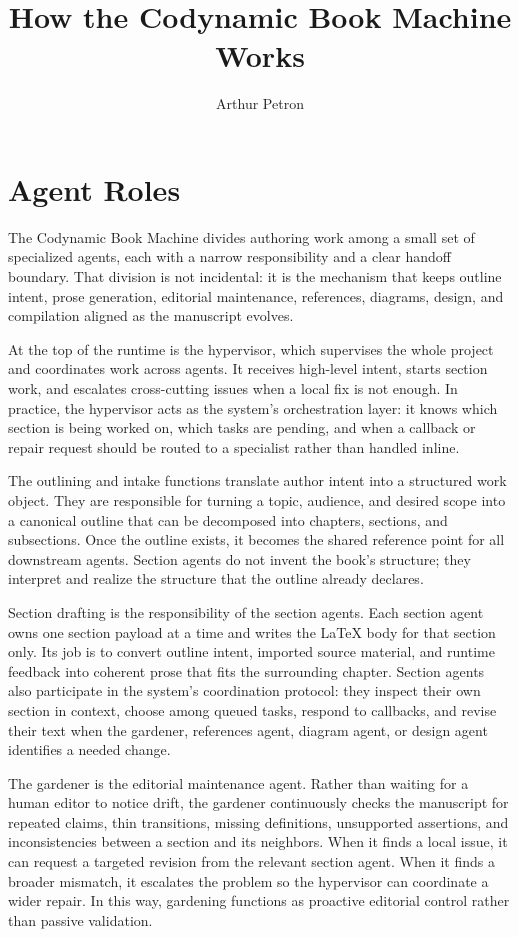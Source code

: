 \documentclass[11pt]{article}
\title{How the Codynamic Book Machine Works}
\author{Arthur Petron}
\begin{document}
\section*{Agent Roles}

The Codynamic Book Machine divides authoring work among a small set of specialized agents, each with a narrow responsibility and a clear handoff boundary. That division is not incidental: it is the mechanism that keeps outline intent, prose generation, editorial maintenance, references, diagrams, design, and compilation aligned as the manuscript evolves.

At the top of the runtime is the hypervisor, which supervises the whole project and coordinates work across agents. It receives high-level intent, starts section work, and escalates cross-cutting issues when a local fix is not enough. In practice, the hypervisor acts as the system's orchestration layer: it knows which section is being worked on, which tasks are pending, and when a callback or repair request should be routed to a specialist rather than handled inline.

The outlining and intake functions translate author intent into a structured work object. They are responsible for turning a topic, audience, and desired scope into a canonical outline that can be decomposed into chapters, sections, and subsections. Once the outline exists, it becomes the shared reference point for all downstream agents. Section agents do not invent the book's structure; they interpret and realize the structure that the outline already declares.

Section drafting is the responsibility of the section agents. Each section agent owns one section payload at a time and writes the \LaTeX{} body for that section only. Its job is to convert outline intent, imported source material, and runtime feedback into coherent prose that fits the surrounding chapter. Section agents also participate in the system's coordination protocol: they inspect their own section in context, choose among queued tasks, respond to callbacks, and revise their text when the gardener, references agent, diagram agent, or design agent identifies a needed change.

The gardener is the editorial maintenance agent. Rather than waiting for a human editor to notice drift, the gardener continuously checks the manuscript for repeated claims, thin transitions, missing definitions, unsupported assertions, and inconsistencies between a section and its neighbors. When it finds a local issue, it can request a targeted revision from the relevant section agent. When it finds a broader mismatch, it escalates the problem so the hypervisor can coordinate a wider repair. In this way, gardening functions as proactive editorial control rather than passive validation.
\end{document}
